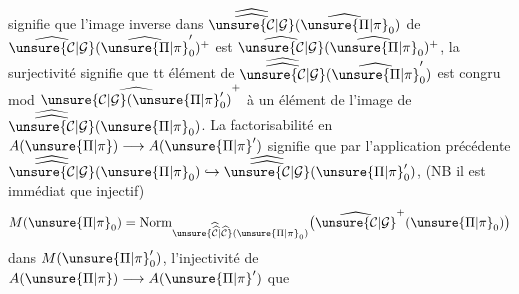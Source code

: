  signifie que l'image inverse dans $\widehat{\widehat{\unsure{\mathcal{C}|\mathcal{G}}}}(\widehat{\unsure{\Pi|\pi}}_0)$ de $\widehat{\unsure{\mathcal{C}|\mathcal{G}}}(\widehat{\unsure{\Pi|\pi}}'_0)^+$ est $\widehat{\unsure{\mathcal{C}|\mathcal{G}}}(\widehat{\unsure{\Pi|\pi}}_0)^+$, la surjectivité  signifie que tt élément de $\widehat{\widehat{\unsure{\mathcal{C}|\mathcal{G}}}}(\widehat{\unsure{\Pi|\pi}}'_0)$ est congru mod $\widehat{\unsure{\mathcal{C}|\mathcal{G}}(\unsure{\Pi|\pi}'_0)}^+$ à un élément de l'image de $\widehat{\widehat{\unsure{\mathcal{C}|\mathcal{G}}}}(\unsure{\Pi|\pi}_0)$. La factorisabilité en $A(\unsure{\Pi|\pi})\longrightarrow A(\unsure{\Pi|\pi}')$ signifie que par  l'application précédente  $\widehat{\widehat{\unsure{\mathcal{C}|\mathcal{G}}}}(\unsure{\Pi|\pi}_0)\hookrightarrow\widehat{\widehat{\unsure{\mathcal{C}|\mathcal{G}}}}(\unsure{\Pi|\pi}'_0)$, (NB il est immédiat que  injectif)  
\[
M(\unsure{\Pi|\pi}_0)=\operatorname{Norm}_{\unsure{\widehat{\widehat{\mathcal{C}}}|\widehat{\mathcal{C}}}(\unsure{\Pi|\pi}_0)}\bigl(\widehat{\unsure{\mathcal{C}|\mathcal{G}}}^{+}(\unsure{\Pi|\pi}_0)\bigr)
\]
dans $M(\unsure{\Pi|\pi}'_0)$, l'injectivité de $A(\unsure{\Pi|\pi})\longrightarrow A(\unsure{\Pi|\pi}')$ que

